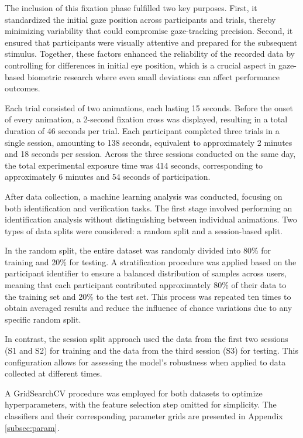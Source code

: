 \documentclass[12pt]{report}
\begin{document}
The inclusion of this fixation phase fulfilled two key purposes. 
First, it standardized the initial gaze position across participants and trials, thereby minimizing variability that could compromise gaze-tracking precision. 
Second, it ensured that participants were visually attentive and prepared for the subsequent stimulus. 
Together, these factors enhanced the reliability of the recorded data by controlling for differences in initial eye position, which is a crucial aspect in gaze-based biometric research where even small deviations can affect performance outcomes.

Each trial consisted of two animations, each lasting 15 seconds. 
Before the onset of every animation, a 2-second fixation cross was displayed, resulting in a total duration of 46 seconds per trial.
Each participant completed three trials in a single session, amounting to 138 seconds, equivalent to approximately 2 minutes and 18 seconds per session.
Across the three sessions conducted on the same day, the total experimental exposure time was 414 seconds, corresponding to approximately 6 minutes and 54 seconds of participation.

After data collection, a machine learning analysis was conducted, focusing on both identification and verification tasks.
The first stage involved performing an identification analysis without distinguishing between individual animations.
Two types of data splits were considered: a random split and a session-based split.

In the random split, the entire dataset was randomly divided into 80\% for training and 20\% for testing.
A stratification procedure was applied based on the participant identifier to ensure a balanced distribution of samples across users, meaning that each participant contributed approximately 80\% of their data to the training set and 20\% to the test set.
This process was repeated ten times to obtain averaged results and reduce the influence of chance variations due to any specific random split.

In contrast, the session split approach used the data from the first two sessions (S1 and S2) for training and the data from the third session (S3) for testing.
This configuration allows for assessing the model’s robustness when applied to data collected at different times.

A GridSearchCV procedure was employed for both datasets to optimize hyperparameters, with the feature selection step omitted for simplicity.
The classifiers and their corresponding parameter grids are presented in Appendix \ref{subsec:param}.
\end{document}
